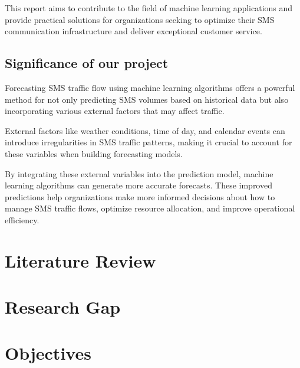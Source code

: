 \documentclass[12pt]{book} %
\begin{document}
This report aims to contribute to the field of machine learning applications and provide practical solutions for organizations seeking to optimize their SMS communication infrastructure and deliver exceptional customer service.




\subsection{Significance of our project}
Forecasting SMS traffic flow using machine learning algorithms offers a powerful method for not only predicting SMS volumes based on historical data but also incorporating various external factors that may affect traffic.

External factors like weather conditions, time of day, and calendar events can introduce irregularities in SMS traffic patterns, making it crucial to account for these variables when building forecasting models.

By integrating these external variables into the prediction model, machine learning algorithms can generate more accurate forecasts. These improved predictions help organizations make more informed decisions about how to manage SMS traffic flows, optimize resource allocation, and improve operational efficiency.




\section{Literature Review}



\section{Research Gap}
\section{Objectives}
\end{document}

